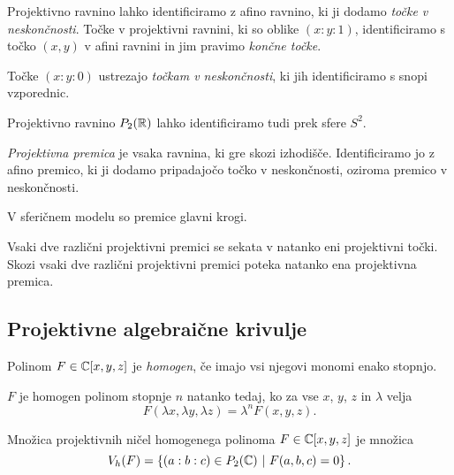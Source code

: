\begin{opomba}
Projektivno ravnino lahko identificiramo z afino ravnino, ki ji
dodamo \emph{točke v neskončnosti}. Točke v projektivni ravnini, ki
so oblike $(x : y : 1)$, identificiramo s točko $(x, y)$ v afini
ravnini in jim pravimo \emph{končne točke}.

Točke $(x : y : 0)$ ustrezajo \emph{točkam v neskončnosti}, ki jih
identificiramo s snopi vzporednic.
\end{opomba}

\begin{opomba}
Projektivno ravnino $P_2(\mathbb{R})$ lahko identificiramo tudi prek sfere
$S^2$.
\end{opomba}

\begin{definicija}
\emph{Projektivna premica} je
vsaka ravnina, ki gre skozi izhodišče. Identificiramo jo z afino
premico, ki ji dodamo pripadajočo točko v neskončnosti, oziroma
premico v neskončnosti.
\end{definicija}

\begin{opomba}
V sferičnem modelu so premice glavni krogi.
\end{opomba}

\begin{opomba}
Vsaki dve različni projektivni premici se sekata v natanko eni
projektivni točki. Skozi vsaki dve različni projektivni premici
poteka natanko ena projektivna premica.
\end{opomba}

\newpage

\subsection{Projektivne algebraične krivulje}

\begin{definicija}
Polinom $F \in \mathbb{C}[x,y,z]$ je \emph{homogen},
če imajo vsi njegovi monomi enako stopnjo.
\end{definicija}

\begin{opomba}
$F$ je homogen polinom stopnje $n$ natanko tedaj, ko za vse $x$,
$y$, $z$ in $\lambda$ velja
\[
F(\lambda x, \lambda y, \lambda z) = \lambda^n F(x, y, z).
\]
\end{opomba}

\begin{definicija}
Množica projektivnih ničel homogenega polinoma $F \in \mathbb{C}[x, y, z]$
je množica
\[
V_h(F) = \left\{(a : b : c) \in P_2(\mathbb{C})~\middle\vert~F(a, b, c) = 0\right\}.
\]
\end{definicija}

